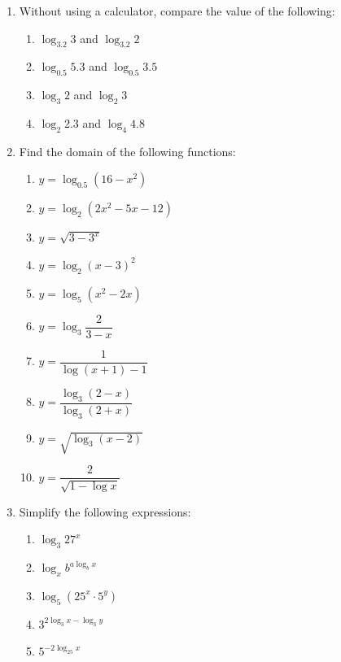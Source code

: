 \documentclass[12pt]{report}
\begin{document}
\begin{multicols}{2}
\begin{enumerate}
        \item Without using a calculator, compare the value of the following:
              \begin{enumerate}
                  \item $\log_{3.2}3$ and $\log_{3.2}2$
                  \item $\log_{0.5}5.3$ and $\log_{0.5}3.5$
                  \item $\log_{3}2$ and $\log_{2}3$
                  \item $\log_{2}2.3$ and $\log_{4}4.8$
              \end{enumerate}

        \item Find the domain of the following functions:
              \begin{enumerate}
                  \item $y=\log_{0.5}\left(16-x^{2}\right)$
                  \item $y=\log_{2}\left(2x^{2}-5x-12\right)$
                  \item $y=\sqrt{3-3^{x}}$
                  \item $y=\log_{2}(x-3)^{2}$
                  \item $y=\log_{5}\left(x^{2}-2x\right)$
                  \item $y=\log_{3}{\dfrac{2}{3-x}}$
                  \item $y=\dfrac{1}{\log(x+1)-1}$
                  \item $y=\dfrac{\log_3\left(2-x\right)}{\log_3\left(2+x\right)}$
                  \item $y=\sqrt{\log_{3}(x-2)}$
                  \item $y={\dfrac{2}{\sqrt{1-\log x}}}$
              \end{enumerate}

        \item Simplify the following expressions:
              \begin{enumerate}
                  \item $\log_{3}27^{x}$
                  \item $\log_{x}b^{a\log_{b}x}$
                  \item $\log_{5}\left(25^{x}\cdot5^{y}\right)$
                  \item $3^{2\log_{3}x - \log_{3}y}$
                  \item $5^{-2\log_{25}x}$
              \end{enumerate}


\end{enumerate}
\end{multicols}
\end{document}
